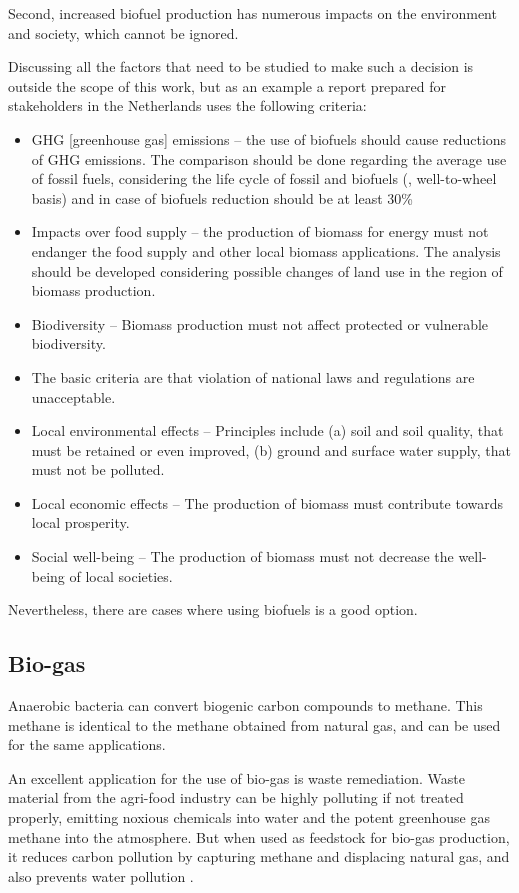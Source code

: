 Second, increased biofuel production has numerous impacts on the environment and
society, which cannot be ignored.

Discussing all the factors that need to be studied to make such a decision is
outside the scope of this work, but as an example a report prepared for
stakeholders in the Netherlands \autocite{Smeets2006} uses the following criteria:

\begin{itemize}
  \item GHG [greenhouse gas] emissions – the use of biofuels should cause reductions of GHG emissions. The
comparison should be done regarding the average use of fossil fuels, considering the life
cycle of fossil and biofuels (, well-to-wheel basis) and in case of biofuels reduction
should be at least 30\%
 \item Impacts over food supply – the production of biomass for energy must not endanger the
food supply and other local biomass applications. The analysis should be developed
considering possible changes of land use in the region of biomass production.
 \item Biodiversity – Biomass production must not affect protected or vulnerable biodiversity.
 \item The basic criteria are that violation of national laws and regulations are unacceptable.
 \item Local environmental effects – Principles include (a) soil and soil quality, that must be
retained or even improved, (b) ground and surface water supply, that must not be polluted.
 \item Local economic effects – The production of biomass must contribute towards local
prosperity.
 \item  Social well-being – The production of biomass must not decrease the well-being of local societies. 
\end{itemize}

Nevertheless, there are cases where using biofuels is a good option. 

\subsection{Bio-gas}

Anaerobic bacteria can convert biogenic carbon compounds to methane. This
methane is identical to the methane obtained from natural gas, and can be used
for the same applications.

An excellent application for the use of bio-gas is waste remediation. Waste
material from the agri-food industry can be highly polluting if not treated
properly, emitting noxious chemicals into water and the potent greenhouse gas
methane into the atmosphere. But when used as feedstock for bio-gas production,
it reduces carbon pollution by capturing methane and displacing natural gas, and
also prevents water pollution \autocite{Venter2014}. 

